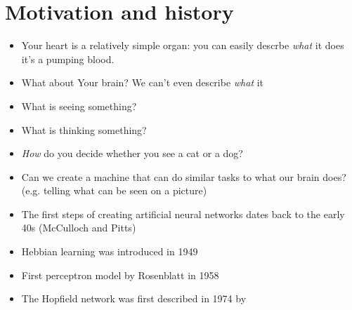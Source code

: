 \documentclass[12pt]{article}
\numberwithin{equation}{section}
\begin{document}
\section*{Motivation and history}
\begin{itemize}
    \item Your heart is a relatively simple organ: you can easily descrbe \textit{what} it does it's a pumping blood.
    \item What about Your brain? We can't even describe \textit{what} it
    \item What is seeing something?
    \item What is thinking something?
    \item \textit{How} do you decide whether you see a cat or a dog?
    \item Can we create a machine that can do similar tasks to what our brain does? (e.g. telling what can be seen on a picture)
    \item The first steps of creating artificial neural networks dates back to the early 40s (McCulloch and Pitts)\cite{pitssmcculloch}
    \item Hebbian learning was introduced in 1949 \cite{hebb2005organization}
    \item First perceptron model by Rosenblatt in 1958 \cite{Rosenblatt58theperceptron}
    \item The Hopfield network was first described in 1974 by \cite{LogicLearningHN_Arxiv}
\end{itemize}

\newpage
\end{document}
